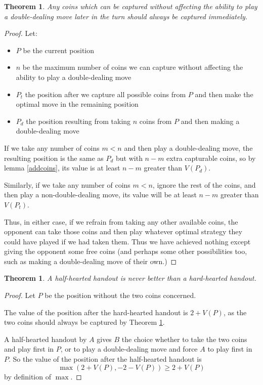 \documentclass[a4paper,twocolumn]{article}
\newtheorem{freecoins}[thm]{Theorem}
\newtheorem{halfheartedbad}[thm]{Theorem}
\begin{document}
\begin{freecoins}\label{freecoins}
  Any coins which can be captured without affecting the ability to
  play a double-dealing move later in the turn should always be
  captured immediately.
\end{freecoins}
\begin{proof}
  Let:
  \begin{itemize}
    \item $P$ be the current position
    \item $n$ be the maximum number of coins we can capture without
      affecting the ability to play a double-dealing move
    \item $P_t$ the position after we capture all possible coins from
      $P$ and then make the optimal move in the remaining position
    \item $P_d$ the position resulting from taking $n$ coins from $P$
      and then making a double-dealing move
  \end{itemize}

  If we take any number of coins $m < n$ and then play a
  double-dealing move, the resulting position is the same as $P_d$ but
  with $n-m$ extra capturable coins, so by lemma \ref{addcoins}, its
  value is at least $n-m$ greater than $V(P_d)$.

  Similarly, if we take any number of coins $m < n$, ignore the rest
  of the coins, and then play a non-double-dealing move, its value
  will be at least $n-m$ greater than $V(P_t)$.

  Thus, in either case, if we refrain from taking any other available
  coins, the opponent can take those coins and then play whatever
  optimal strategy they could have played if we had taken them. Thus
  we have achieved nothing except giving the opponent some free coins
  (and perhaps some other possibilities too, such as making a
  double-dealing move of their own.)
\end{proof}

\begin{halfheartedbad}
  A half-hearted handout is never better than a hard-hearted handout.
\end{halfheartedbad}
\begin{proof}
  Let $P$ be the position without the two coins concerned.

  The value of the position after the hard-hearted handout is
  $2+V(P)$, as the two coins should always be captured by Theorem
  \ref{freecoins}.

  A half-hearted handout by $A$ gives $B$ the choice whether to take
  the two coins and play first in $P$, or to play a double-dealing
  move and force $A$ to play first in $P$. So the value of the
  position after the half-hearted handout is $$\max(2+V(P),-2-V(P))
  \ge 2+V(P)$$ by definition of $\max$.
\end{proof}
\end{document}
